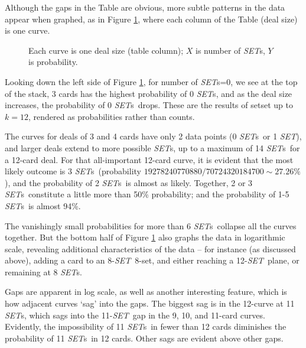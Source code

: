 \documentclass{article}
\newcommand{\SET}{{\em SET}}
\newcommand{\SETs}{{\em SET}s}
\newcommand{\SETSETb}{{\sc setset }}
\begin{document}
Although the gaps in the Table are obvious, more subtle patterns in the data
appear when graphed, as in Figure \ref{FIGCOLS}, where each column of the Table
(deal size) is one curve.

\begin{figure}[!htb]
  \caption{\label{FIGCOLS} Each curve is one deal size (table column); $X$ is
    number of \SETs, $Y$ is probability.}
\end{figure}

Looking down the left side of Figure \ref{FIGCOLS}, for number of \SETs=0, we
see at the top of the stack, 3 cards has the highest probability of 0 \SETs, and
as the deal size increases, the probability of 0 \SETs~drops. These are the
results of \SETSETb up to $k=12$, rendered as probabilities rather than counts. 

The curves for deals of 3 and 4 cards have only 2 data points (0 \SETs~or 1
\SET), and larger deals extend to more possible \SETs, up to a maximum of 14
\SETs~for a 12-card deal. For that all-important 12-card curve, it is evident
that the most likely outcome is 3 \SETs~(probability
$19278240770880/70724320184700\sim 27.26\%$), and the probability of 2 \SETs~is
almost as likely. Together, 2 or 3 \SETs~constitute a little more than 50\%
probability; and the probability of 1-5 \SETs~is almost 94\%.

The vanishingly small probabilities for more than 6 \SETs~collapse all the
curves together. But the bottom half of Figure \ref{FIGCOLS} also graphs the
data in logarithmic scale, revealing additional characteristics of the data --
for instance (as discussed above), adding a  card to an 8-\SET~8-set, and
either reaching a 12-\SET~plane, or remaining at 8 \SETs.

Gaps are apparent in log scale, as well as another interesting feature, which is
how adjacent curves `sag' into the gaps. The biggest sag is in the 12-curve at
11 \SETs, which sags into the 11-\SET~gap in the 9, 10, and 11-card
curves. Evidently, the impossibility of 11 \SETs~in fewer than 12 cards
diminishes the probability of 11 \SETs~in 12 cards. Other sags are evident above
other gaps.
\end{document}
